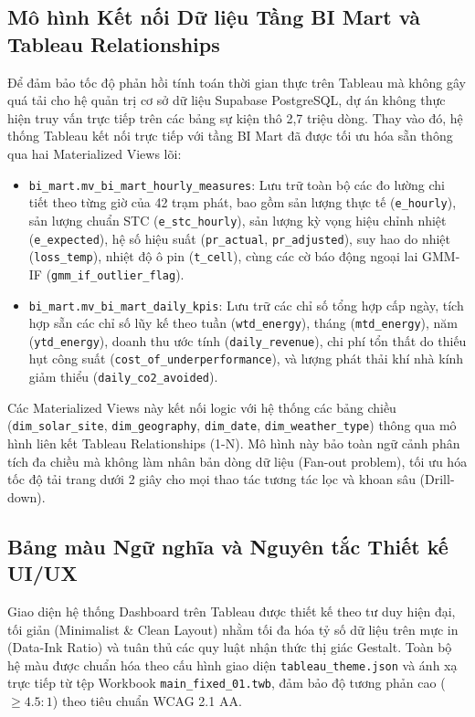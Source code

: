 \documentclass[12pt, a4paper]{report}
\begin{document}
\subsection{Mô hình Kết nối Dữ liệu Tầng BI Mart và Tableau Relationships}
\label{subsec:bi_mart_model}

Để đảm bảo tốc độ phản hồi tính toán thời gian thực trên Tableau mà không gây quá tải cho hệ quản trị cơ sở dữ liệu Supabase PostgreSQL, dự án không thực hiện truy vấn trực tiếp trên các bảng sự kiện thô 2,7 triệu dòng. Thay vào đó, hệ thống Tableau kết nối trực tiếp với tầng BI Mart đã được tối ưu hóa sẵn thông qua hai Materialized Views lõi:
\begin{itemize}
    \item \texttt{bi\_mart.mv\_bi\_mart\_hourly\_measures}: Lưu trữ toàn bộ các đo lường chi tiết theo từng giờ của 42 trạm phát, bao gồm sản lượng thực tế (\texttt{e\_hourly}), sản lượng chuẩn STC (\texttt{e\_stc\_hourly}), sản lượng kỳ vọng hiệu chỉnh nhiệt (\texttt{e\_expected}), hệ số hiệu suất (\texttt{pr\_actual}, \texttt{pr\_adjusted}), suy hao do nhiệt (\texttt{loss\_temp}), nhiệt độ ô pin (\texttt{t\_cell}), cùng các cờ báo động ngoại lai GMM-IF (\texttt{gmm\_if\_outlier\_flag}).
    \item \texttt{bi\_mart.mv\_bi\_mart\_daily\_kpis}: Lưu trữ các chỉ số tổng hợp cấp ngày, tích hợp sẵn các chỉ số lũy kế theo tuần (\texttt{wtd\_energy}), tháng (\texttt{mtd\_energy}), năm (\texttt{ytd\_energy}), doanh thu ước tính (\texttt{daily\_revenue}), chi phí tổn thất do thiếu hụt công suất (\texttt{cost\_of\_underperformance}), và lượng phát thải khí nhà kính giảm thiểu (\texttt{daily\_co2\_avoided}).
\end{itemize}

Các Materialized Views này kết nối logic với hệ thống các bảng chiều (\texttt{dim\_solar\_site}, \texttt{dim\_geography}, \texttt{dim\_date}, \texttt{dim\_weather\_type}) thông qua mô hình liên kết Tableau Relationships (1-N). Mô hình này bảo toàn ngữ cảnh phân tích đa chiều mà không làm nhân bản dòng dữ liệu (Fan-out problem), tối ưu hóa tốc độ tải trang dưới 2 giây cho mọi thao tác tương tác lọc và khoan sâu (Drill-down).

\subsection{Bảng màu Ngữ nghĩa và Nguyên tắc Thiết kế UI/UX}
\label{subsec:color_palette}

Giao diện hệ thống Dashboard trên Tableau được thiết kế theo tư duy hiện đại, tối giản (Minimalist \& Clean Layout) nhằm tối đa hóa tỷ số dữ liệu trên mực in (Data-Ink Ratio) và tuân thủ các quy luật nhận thức thị giác Gestalt. Toàn bộ hệ màu được chuẩn hóa theo cấu hình giao diện \texttt{tableau\_theme.json} và ánh xạ trực tiếp từ tệp Workbook \texttt{main\_fixed\_01.twb}, đảm bảo độ tương phản cao ($\ge 4.5:1$) theo tiêu chuẩn WCAG 2.1 AA.
\end{document}
